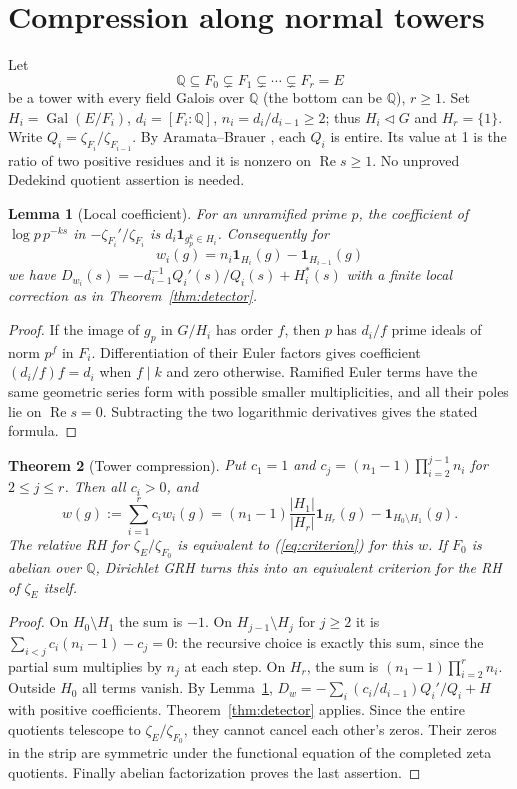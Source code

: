 \documentclass[11pt]{article}
\newtheorem{theorem}{Theorem}[section]
\newtheorem{lemma}[theorem]{Lemma}
\theoremstyle{remark}\newtheorem{remark}[theorem]{Remark}
\newcommand{\Q}{\mathbb Q}\newcommand{\C}{\mathbb C}\newcommand{\R}{\mathbb R}\newcommand{\ind}{\mathbf 1}\newcommand{\ord}{\operatorname{ord}}\newcommand{\Rea}{\operatorname{Re}}
\begin{document}
\section{Compression along normal towers}
Let
\[
\Q\subseteq F_0\subsetneq F_1\subsetneq\cdots\subsetneq F_r=E
\]
be a tower with every field Galois over $\Q$ (the bottom can be $\Q$), $r\ge1$. Set $H_i=\operatorname{Gal}(E/F_i)$, $d_i=[F_i:\Q]$, $n_i=d_i/d_{i-1}\ge2$; thus $H_i\triangleleft G$ and $H_r=\{1\}$. Write $Q_i=\zeta_{F_i}/\zeta_{F_{i-1}}$. By Aramata--Brauer \cite{brauer,murty}, each $Q_i$ is entire. Its value at 1 is the ratio of two positive residues and it is nonzero on $\Rea s\ge1$. No unproved Dedekind quotient assertion is needed.

\begin{lemma}[Local coefficient]\label{lem:local}
For an unramified prime $p$, the coefficient of $\log p\,p^{-ks}$ in $-\zeta_{F_i}'/\zeta_{F_i}$ is $d_i\ind_{g_p^k\in H_i}$. Consequently for
\[
w_i(g)=n_i\ind_{H_i}(g)-\ind_{H_{i-1}}(g)
\]
we have $D_{w_i}(s)=-d_{i-1}^{-1}Q_i'(s)/Q_i(s)+H_i^*(s)$ with a finite local correction as in Theorem~\ref{thm:detector}.
\end{lemma}
\begin{proof}
If the image of $g_p$ in $G/H_i$ has order $f$, then $p$ has $d_i/f$ prime ideals of norm $p^f$ in $F_i$. Differentiation of their Euler factors gives coefficient $(d_i/f)f=d_i$ when $f\mid k$ and zero otherwise. Ramified Euler terms have the same geometric series form with possible smaller multiplicities, and all their poles lie on $\Rea s=0$. Subtracting the two logarithmic derivatives gives the stated formula.
\end{proof}

\begin{theorem}[Tower compression]\label{thm:tower}
Put $c_1=1$ and $c_j=(n_1-1)\prod_{i=2}^{j-1}n_i$ for $2\le j\le r$. Then all $c_i>0$, and
\begin{equation}\label{eq:compressed}
w(g):=\sum_{i=1}^r c_iw_i(g)
= (n_1-1)\frac{|H_1|}{|H_r|}\ind_{H_r}(g)-\ind_{H_0\setminus H_1}(g).
\end{equation}
The relative RH for $\zeta_E/\zeta_{F_0}$ is equivalent to (\ref{eq:criterion}) for this $w$. If $F_0$ is abelian over $\Q$, Dirichlet GRH turns this into an equivalent criterion for the RH of $\zeta_E$ itself.
\end{theorem}
\begin{proof}
On $H_0\setminus H_1$ the sum is $-1$. On $H_{j-1}\setminus H_j$ for $j\ge2$ it is $\sum_{i<j}c_i(n_i-1)-c_j=0$: the recursive choice is exactly this sum, since the partial sum multiplies by $n_j$ at each step. On $H_r$, the sum is $(n_1-1)\prod_{i=2}^r n_i$. Outside $H_0$ all terms vanish. By Lemma~\ref{lem:local}, $D_w=-\sum_i(c_i/d_{i-1})Q_i'/Q_i+H$ with positive coefficients. Theorem~\ref{thm:detector} applies. Since the entire quotients telescope to $\zeta_E/\zeta_{F_0}$, they cannot cancel each other's zeros. Their zeros in the strip are symmetric under the functional equation of the completed zeta quotients. Finally abelian factorization proves the last assertion.
\end{proof}
\end{document}
